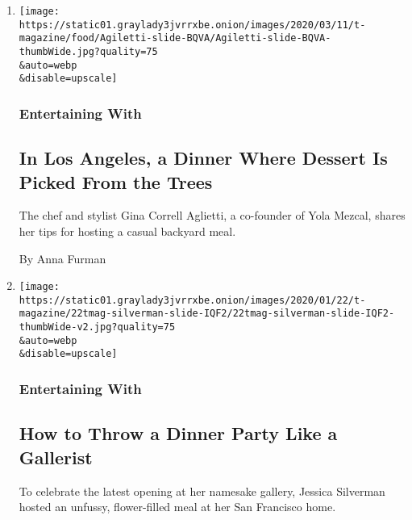 \begin{enumerate}
\def\labelenumi{\arabic{enumi}.}
\item
  \href{/2020/03/13/t-magazine/gina-correll-aglietti-yola-mezcal.html}{}

  \texttt{[image: https://static01.graylady3jvrrxbe.onion/images/2020/03/11/t-magazine/food/Agiletti-slide-BQVA/Agiletti-slide-BQVA-thumbWide.jpg?quality=75\\\&auto=webp\\\&disable=upscale]}

  \hypertarget{entertaining-with}{%
  \subsubsection{Entertaining With}\label{entertaining-with}}

  \hypertarget{in-los-angeles-a-dinner-where-dessert-is-picked-from-the-trees}{%
  \subsection{In Los Angeles, a Dinner Where Dessert Is Picked From the
  Trees}\label{in-los-angeles-a-dinner-where-dessert-is-picked-from-the-trees}}

  The chef and stylist Gina Correll Aglietti, a co-founder of Yola
  Mezcal, shares her tips for hosting a casual backyard meal.

  By Anna Furman
\item
  \href{/2020/01/22/t-magazine/jessica-silverman-gallery.html}{}

  \texttt{[image: https://static01.graylady3jvrrxbe.onion/images/2020/01/22/t-magazine/22tmag-silverman-slide-IQF2/22tmag-silverman-slide-IQF2-thumbWide-v2.jpg?quality=75\\\&auto=webp\\\&disable=upscale]}

  \hypertarget{entertaining-with-1}{%
  \subsubsection{Entertaining With}\label{entertaining-with-1}}

  \hypertarget{how-to-throw-a-dinner-party-like-a-gallerist}{%
  \subsection{How to Throw a Dinner Party Like a
  Gallerist}\label{how-to-throw-a-dinner-party-like-a-gallerist}}

  To celebrate the latest opening at her namesake gallery, Jessica
  Silverman hosted an unfussy, flower-filled meal at her San Francisco
  home.


\end{enumerate}
